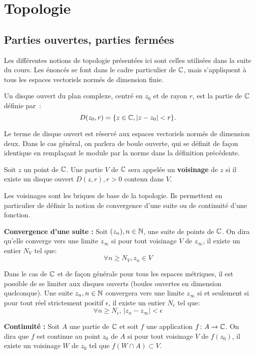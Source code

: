 \section{Topologie}
\subsection{Parties ouvertes, parties fermées}
Les différentes notions de topologie présentées ici sont celles utilisées dans la suite du cours. Les énoncés se font dans le cadre particulier de $\mathbb{C}$, mais s'appliquent à tous les espaces vectoriels normés de dimension finie. 
\begin{fdefn}
	Un disque ouvert du plan complexe, centré en $z_0$ et de rayon $r$, est la partie de $\mathbb{C}$ définie par~:
	\[D(z_0,r) = \{ z \in \mathbb{C} , \lvert z-z_0 \rvert <r\}.\]
\end{fdefn}
\begin{rem}
 Le terme de disque ouvert est réservé aux espaces vectoriels normés de dimension deux. Dans le cas général, on parlera de boule ouverte, qui se définit de façon identique en remplaçant le module par la norme dans la définition précédente.
 \end{rem}
\begin{fdefn}
	Soit $z$ un point de $\mathbb{C}$. Une partie $V$ de $\mathbb{C}$ sera appelée un \textbf{voisinage} de $z$ si il existe un disque ouvert $D(z,r), r > 0$ contenu dans $V$.
\end{fdefn}
Les voisinages sont les briques de base de la topologie. Ils permettent en particulier de définir la notion de convergence d'une suite ou de continuité d'une fonction.
\begin{fdefn}
    \textbf{Convergence d'une suite :}
	Soit $(z_n), n  \in {\mathbb N}$, une suite de points de $\mathbb{C}$. On dira qu'elle converge vers une limite $z_\infty$ si pour tout voisinage $V$ de $z_\infty$, il existe un entier $N_V$ tel que:
	\[
	\forall n \geq N_V, z_n \in V
	\]
\end{fdefn}
Dans le cas de $\mathbb{C}$ et de façon générale pour tous les espaces métriques, il est possible de se limiter aux disques ouverts (boules ouvertes en dimension quelconque). Une suite $z_n, n \in {\mathbb N}$ convergera vers une limite $z_\infty$ si et seulement si pour tout réel strictement positif $\epsilon$, il existe un entier $N_\epsilon$  tel que:
\[
\forall n \geq N_\epsilon, \,|z_n-z_\infty| < \epsilon
\]
\begin{fdefn}
\textbf{Continuité :}
Soit $A$ une partie de $\mathbb{C}$ et soit $f$ une application $f \colon A \to \mathbb{C}$. On dira que $f$ est continue au point $z_0$ de $A$ si pour tout voisinage $V$ de $f(z_0)$, il existe un voisinage $W$ de $z_0$ tel que $f\left(W \cap A\right) \subset V$.
\end{fdefn}
